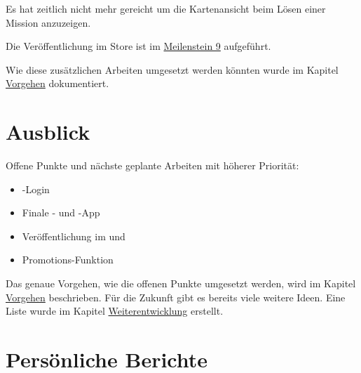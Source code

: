 Es hat zeitlich nicht mehr gereicht um die Kartenansicht beim Lösen einer Mission anzuzeigen.

Die Veröffentlichung im  Store ist im \hyperref[pm-ms9]{Meilenstein 9} aufgeführt.

Wie diese zusätzlichen Arbeiten umgesetzt werden könnten wurde im Kapitel \hyperref[pd-weiterentwicklung-vorgehen]{Vorgehen} dokumentiert.

\section{Ausblick}
Offene Punkte und nächste geplante Arbeiten mit höherer Priorität:

\begin{itemize}
	\item {}-Login
	\item Finale - und -App
	\item Veröffentlichung im  und  
	\item Promotions-Funktion
\end{itemize}

Das genaue Vorgehen, wie die offenen Punkte umgesetzt werden, wird im Kapitel \hyperref[pd-weiterentwicklung-vorgehen]{Vorgehen} beschrieben.
Für die Zukunft gibt es bereits viele weitere Ideen. 
Eine Liste wurde im Kapitel \hyperref[pd-weiterentwicklung-realistisch]{Weiterentwicklung} erstellt. 

\section{Persönliche Berichte}
